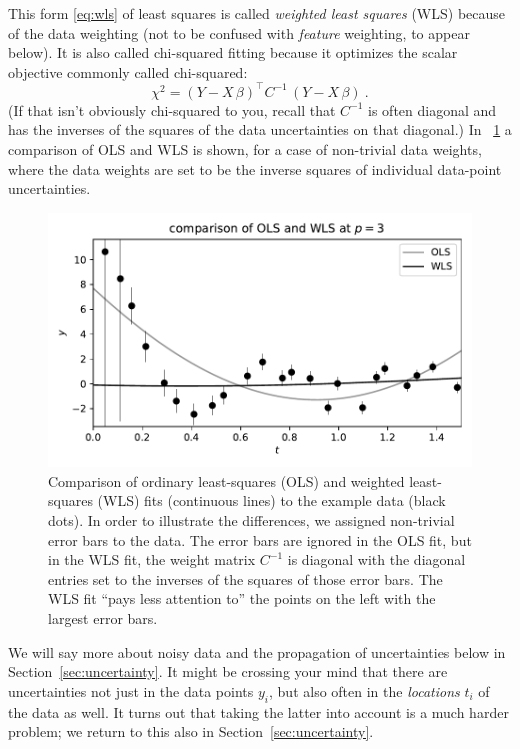 \documentclass[12pt,letterpaper]{article}
\newlength{\figurewidth}
\newcommand{\sectionname}{Section}
\begin{document}
This form \eqref{eq:wls} of least squares is called \emph{weighted least squares} (WLS) because of the data weighting (not to be confused with \emph{feature} weighting, to appear below).
It is also called chi-squared fitting because it optimizes the scalar objective commonly called chi-squared:
\begin{equation}
    \chi^2 = (Y - X\,\beta)^\top C^{-1}\,(Y - X\,\beta)
    ~.
\end{equation}
(If that isn't obviously chi-squared to you, recall that $C^{-1}$ is often diagonal and has the inverses of the squares of the data uncertainties on that diagonal.)
In \figurename~\ref{fig:wls} a comparison of OLS and WLS is shown, for a case of non-trivial data weights, where the data weights are set to be the inverse squares of individual data-point uncertainties.
\begin{figure}[t]
    \begin{mdframed}
    \includegraphics[width=\figurewidth]{paper/WLS.pdf}
    \caption{Comparison of ordinary least-squares (OLS) and weighted least-squares (WLS) fits (continuous lines) to the example data (black dots). In order to illustrate the differences, we assigned non-trivial error bars to the data. The error bars are ignored in the OLS fit, but in the WLS fit, the weight matrix $C^{-1}$ is diagonal with the diagonal entries set to the inverses of the squares of those error bars. The WLS fit ``pays less attention to'' the points on the left with the largest error bars.}
    \label{fig:wls}
    \end{mdframed}
\end{figure}

We will say more about noisy data and the propagation of uncertainties below in \sectionname~\ref{sec:uncertainty}.
It might be crossing your mind that there are uncertainties not just in the data points $y_i$, but also often in the \emph{locations} $t_i$ of the data as well. It turns out that taking the latter into account is a much harder problem; we return to this also in \sectionname~\ref{sec:uncertainty}.
\end{document}
